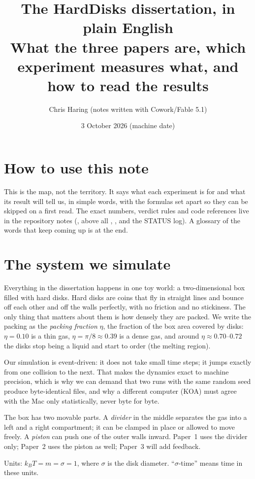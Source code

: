 \documentclass[11pt]{article}
\title{The HardDisks dissertation, in plain English\\
\large What the three papers are, which experiment measures what, and how to read the results}
\author{Chris Haring (notes written with Cowork/Fable 5.1)}
\date{3 October 2026 (machine date)}
\begin{document}
\maketitle

\section*{How to use this note}
This is the map, not the territory. It says what each experiment is for and what its result will tell us, in simple words, with the formulas set apart so they can be skipped on a first read. The exact numbers, verdict rules and code references live in the repository notes (, above all , ,  and the STATUS log). A glossary of the words that keep coming up is at the end.

\section{The system we simulate}
Everything in the dissertation happens in one toy world: a two-dimensional box filled with hard disks. Hard disks are coins that fly in straight lines and bounce off each other and off the walls perfectly, with no friction and no stickiness. The only thing that matters about them is how densely they are packed. We write the packing as the \emph{packing fraction} $\eta$, the fraction of the box area covered by disks: $\eta = 0.10$ is a thin gas, $\eta = \pi/8 \approx 0.39$ is a dense gas, and around $\eta \approx 0.70$--$0.72$ the disks stop being a liquid and start to order (the melting region).

Our simulation is event-driven: it does not take small time steps; it jumps exactly from one collision to the next. That makes the dynamics exact to machine precision, which is why we can demand that two runs with the same random seed produce byte-identical files, and why a different computer (KOA) must agree with the Mac only statistically, never byte for byte.

The box has two movable parts. A \emph{divider} in the middle separates the gas into a left and a right compartment; it can be clamped in place or allowed to move freely. A \emph{piston} can push one of the outer walls inward. Paper~1 uses the divider only; Paper~2 uses the piston as well; Paper~3 will add feedback.

Units: $k_B T = m = \sigma = 1$, where $\sigma$ is the disk diameter. ``$\sigma$-time'' means time in these units.
\end{document}

